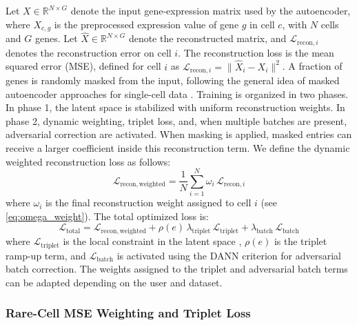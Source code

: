 \documentclass[11pt,a4paper]{article}
\begin{document}
Let $X \in \mathbb{R}^{N \times G}$ denote the
input gene-expression matrix used by the autoencoder, where $X_{c,g}$
is the preprocessed expression value of gene $g$ in cell $c$, with $N$
cells and $G$ genes. Let $\hat{X} \in \mathbb{R}^{N \times G}$ denote
the reconstructed matrix, and
$\mathcal{L}_{\mathrm{recon},i}$ denotes the reconstruction
error on cell $i$. The reconstruction loss is the mean squared error (MSE), defined for cell $i$ as
$\mathcal{L}_{\mathrm{recon},i} = \lVert \hat{X}_i - X_i \rVert^2$.
A fraction of genes is randomly masked from the input, following the general idea of masked autoencoder approaches for single-cell data \cite{fang2024,richter2025}. Training is organized in two phases. In phase 1, the latent space is stabilized with uniform reconstruction weights. In phase 2, dynamic weighting, triplet loss, and, when multiple batches are present, adversarial correction are activated. When masking is applied, masked entries can receive a larger coefficient inside this reconstruction term. We define the dynamic weighted reconstruction loss as follows:
\begin{equation}
  \mathcal{L}_{\mathrm{recon,weighted}}
  =
  \frac{1}{N}\sum_{i=1}^{N} \omega_i\,\mathcal{L}_{\mathrm{recon},i}
\end{equation}
where $\omega_i$ is the final reconstruction weight assigned to cell
$i$ (see \autoref{eq:omega_weight}).
The total optimized loss is:
\begin{equation}
  \mathcal{L}_{\mathrm{total}}
  =
  \mathcal{L}_{\mathrm{recon,weighted}}
  +
  \rho(e)\,\lambda_{\mathrm{triplet}}\,\mathcal{L}_{\mathrm{triplet}}
  +
  \lambda_{\mathrm{batch}}\,\mathcal{L}_{\mathrm{batch}}
\end{equation}
where $\mathcal{L}_{\mathrm{triplet}}$ is the local constraint in the
latent space \cite{schroff2015,yang2016}, $\rho(e)$ is the triplet ramp-up term, and
$\mathcal{L}_{\mathrm{batch}}$ is activated using the DANN criterion
\cite{ganin2016} for adversarial batch correction.
The weights assigned to the triplet and adversarial batch terms can be
adapted depending on the user and dataset.



\subsubsection*{Rare-Cell MSE Weighting and Triplet Loss}
\end{document}
